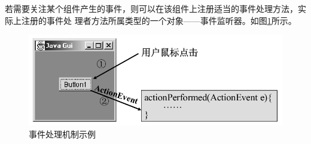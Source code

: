 若需要关注某个组件产生的事件，则可以在该组件上注册适当的事件处理方法，实际上注册的事件处
理者方法所属类型的一个对象——事件监听器。如图\ref{fig:fig-event-handle-sample}所示。

\begin{figure}[htb]
\centering
\includegraphics[width=.8\textwidth]{images/Java-GUI-programming/fig-event-handle-sample.png}
\caption{事件处理机制示例}
\label{fig:fig-event-handle-sample}
\end{figure}


